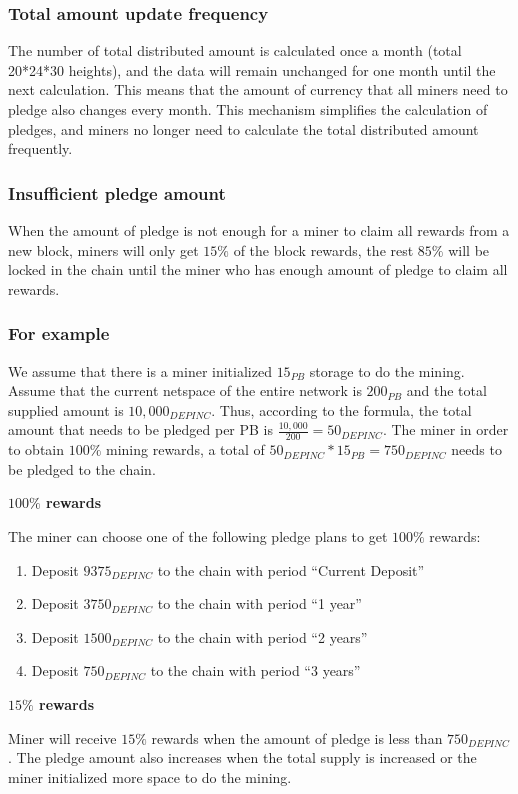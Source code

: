 \subsubsection{Total amount update frequency}
\begin{flushleft}
    The number of total distributed amount is calculated once a month (total 20*24*30 heights), and the data will remain unchanged for one month until the next calculation. This means that the amount of currency that all miners need to pledge also changes every month. This mechanism simplifies the calculation of pledges, and miners no longer need to calculate the total distributed amount frequently.
\end{flushleft}
\subsubsection{Insufficient pledge amount}
\begin{flushleft}
    When the amount of pledge is not enough for a miner to claim all rewards from a new block, miners will only get $15\%$ of the block rewards, the rest $85\%$ will be locked in the chain until the miner who has enough amount of pledge to claim all rewards.
\end{flushleft}
\subsubsection{For example}
\begin{flushleft}
    We assume that there is a miner initialized $15_{PB}$ storage to do the mining. Assume that the current netspace of the entire network is $200_{PB}$ and the total supplied amount is $10,000_{DEPINC}$. Thus, according to the formula, the total amount that needs to be pledged per PB is $\frac{10,000}{200}=50_{DEPINC}$. The miner in order to obtain $100\%$ mining rewards, a total of $50_{DEPINC} * 15_{PB} = 750_{DEPINC}$ needs to be pledged to the chain.
\end{flushleft}
\textbf{$100\%$ rewards}
\begin{flushleft}
    The miner can choose one of the following pledge plans to get $100\%$ rewards:
    \begin{enumerate}
        \item Deposit $9375_{DEPINC}$ to the chain with period ``Current Deposit''
        \item Deposit $3750_{DEPINC}$ to the chain with period ``1 year''
        \item Deposit $1500_{DEPINC}$ to the chain with period ``2 years''
        \item Deposit $750_{DEPINC}$ to the chain with period ``3 years''
    \end{enumerate}
\end{flushleft}
\textbf{$15\%$ rewards}
\begin{flushleft}
    Miner will receive $15\%$ rewards when the amount of pledge is less than $750_{DEPINC}$. The pledge amount also increases when the total supply is increased or the miner initialized more space to do the mining.
\end{flushleft}
